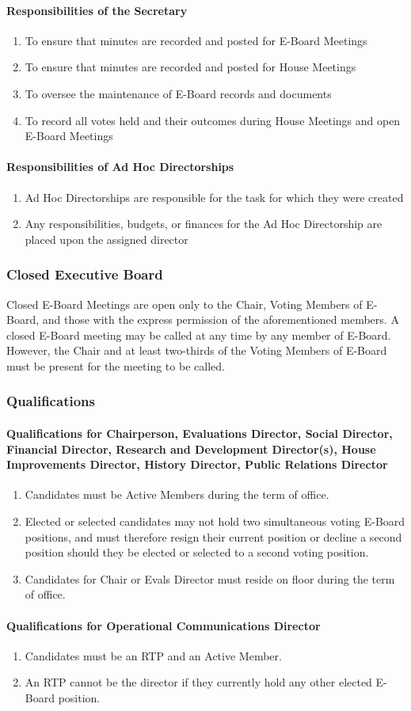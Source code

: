 \documentclass{article}
\newcommand{\asubsection}[1]{\subsubsection{#1} \label{#1}}
\newcommand{\asubsubsection}[1]{\paragraph{#1} \label{#1}}
\begin{document}
\asubsubsection{Responsibilities of the Secretary}
\begin{enumerate}
	\item To ensure that minutes are recorded and posted for E-Board Meetings
	\item To ensure that minutes are recorded and posted for House Meetings
	\item To oversee the maintenance of E-Board records and documents
	\item To record all votes held and their outcomes during House Meetings and open E-Board Meetings
\end{enumerate}

\asubsubsection{Responsibilities of Ad Hoc Directorships}
\begin{enumerate}
	\item Ad Hoc Directorships are responsible for the task for which they were created
	\item Any responsibilities, budgets, or finances for the Ad Hoc Directorship are placed upon the assigned director
\end{enumerate}

\asubsection{Closed Executive Board}
Closed E-Board Meetings are open only to the Chair, Voting Members of E-Board, and those with the express permission of the aforementioned members.
A closed E-Board meeting may be called at any time by any member of E-Board.
However, the Chair and at least two-thirds of the Voting Members of E-Board must be present for the meeting to be called.

\asubsection{Qualifications}

\asubsubsection{Qualifications for Chairperson, Evaluations Director, Social Director, Financial Director, Research and Development Director(s), House Improvements Director, History Director, Public Relations Director}
\begin{enumerate}
	\item Candidates must be Active Members during the term of office.
	\item Elected or selected candidates may not hold two simultaneous voting E-Board positions, and must therefore resign their current position or decline a second position should they be elected or selected to a second voting position.
	\item Candidates for Chair or Evals Director must reside on floor during the term of office.
\end{enumerate}

\asubsubsection{Qualifications for Operational Communications Director}
\begin{enumerate}
	\item Candidates must be an RTP and an Active Member.
	\item An RTP cannot be the director if they currently hold any other elected E-Board position. %
\end{enumerate}
\end{document}
